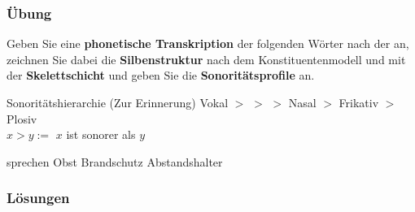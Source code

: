 {
\begin{frame}
\frametitle{Übung}

Geben Sie eine \textbf{phonetische Transkription} der folgenden Wörter nach der  an, zeichnen Sie dabei die \textbf{Silbenstruktur} nach dem Konstituentenmodell und mit der \textbf{Skelettschicht} und geben Sie die \textbf{Sonoritätsprofile} an.

\begin{block}{Sonoritätshierarchie (Zur Erinnerung)}
	Vokal $>$ \textipa{/\textscr /} $>$  $>$ Nasal $>$ Frikativ $>$ Plosiv \\
	$x > y :=$ $x$ ist sonorer als $y$
\end{block}

\begin{multicols}{2}
	\eal 
	\ex sprechen
	\ex Obst
	\ex Brandschutz
	\ex Abstandshalter
	\zl
\end{multicols}

\end{frame}

	
\begin{frame}
\frametitle{Lösungen}


\end{frame}}
